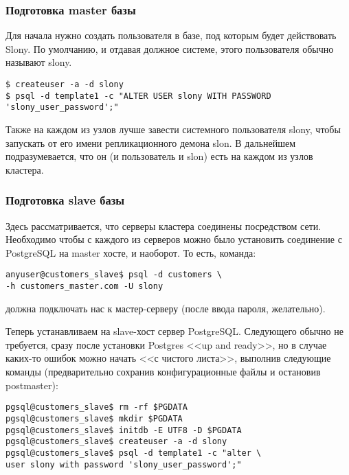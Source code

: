 \subsubsection{Подготовка master базы}
\label{subsec:slonyI-settings-1}

Для начала нужно создать пользователя в базе, под которым будет действовать Slony. По умолчанию, и отдавая должное системе, этого пользователя обычно называют slony.

\begin{lstlisting}[label=lst:slony2,caption=Подготовка master-сервера]
$ createuser -a -d slony
$ psql -d template1 -c "ALTER USER slony WITH PASSWORD 'slony_user_password';"
\end{lstlisting}

Также на каждом из узлов лучше завести системного пользователя slony, чтобы запускать от его имени репликационного демона slon. В дальнейшем подразумевается, что он (и пользователь и slon) есть на каждом из узлов кластера.

\subsubsection{Подготовка slave базы}
\label{subsec:slonyI-settings-2}

Здесь рассматривается, что серверы кластера соединены посредством сети. Необходимо чтобы с каждого из серверов можно было установить соединение с PostgreSQL на master хосте, и наоборот. То есть, команда:

\begin{lstlisting}[label=lst:slony3,caption=Подготовка одного slave-сервера]
anyuser@customers_slave$ psql -d customers \
-h customers_master.com -U slony
\end{lstlisting}

должна подключать нас к мастер-серверу (после ввода пароля, желательно).

Теперь устанавливаем на slave-хост сервер PostgreSQL. Следующего обычно не требуется, сразу после установки Postgres <<up and ready>>, но в случае каких-то ошибок можно начать <<с чистого листа>>, выполнив следующие команды (предварительно сохранив конфигурационные файлы и остановив postmaster):

\begin{lstlisting}[label=lst:slony4,caption=Подготовка одного slave-сервера]
pgsql@customers_slave$ rm -rf $PGDATA
pgsql@customers_slave$ mkdir $PGDATA
pgsql@customers_slave$ initdb -E UTF8 -D $PGDATA
pgsql@customers_slave$ createuser -a -d slony
pgsql@customers_slave$ psql -d template1 -c "alter \
user slony with password 'slony_user_password';"
\end{lstlisting}

